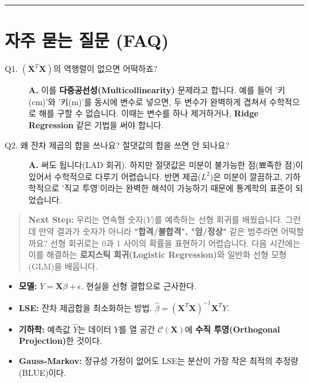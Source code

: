 \documentclass[11pt,a4paper]{book}
\theoremstyle{definition}
\begin{document}
\vspace{0.5cm}\hrule\vspace{0.5cm}

\section{자주 묻는 질문 (FAQ)}

\begin{description}
    \item[Q1. $(\mathbf{X}^T \mathbf{X})$의 역행렬이 없으면 어떡하죠?]
    \textbf{A.} 이를 \textbf{다중공선성(Multicollinearity)} 문제라고 합니다. 예를 들어 '키(cm)'와 '키(m)'를 동시에 변수로 넣으면, 두 변수가 완벽하게 겹쳐서 수학적으로 해를 구할 수 없습니다. 이때는 변수를 하나 제거하거나, \textbf{Ridge Regression} 같은 기법을 써야 합니다.
    
    \item[Q2. 왜 잔차 제곱의 합을 쓰나요? 절댓값의 합을 쓰면 안 되나요?]
    \textbf{A.} 써도 됩니다(LAD 회귀). 하지만 절댓값은 미분이 불가능한 점(뾰족한 점)이 있어서 수학적으로 다루기 어렵습니다. 반면 제곱($L^2$)은 미분이 깔끔하고, 기하학적으로 '직교 투영'이라는 완벽한 해석이 가능하기 때문에 통계학의 표준이 되었습니다.
\end{description}

\vspace{1cm}
\begin{quote}
\textbf{Next Step:} 우리는 연속형 숫자($Y$)를 예측하는 선형 회귀를 배웠습니다. 그런데 만약 결과가 숫자가 아니라 \textbf{"합격/불합격", "암/정상"} 같은 범주라면 어떡할까요? 선형 회귀로는 0과 1 사이의 확률을 표현하기 어렵습니다. 다음 시간에는 이를 해결하는 \textbf{로지스틱 회귀(Logistic Regression)}와 일반화 선형 모형(GLM)을 배웁니다.
\end{quote}

\begin{summarybox}[title={Unit 3 핵심 요약}]
\begin{itemize}
    \item \textbf{모델:} $Y = \mathbf{X}\beta + \epsilon$. 현실을 선형 결합으로 근사한다.
    \item \textbf{LSE:} 잔차 제곱합을 최소화하는 방법. $\hat{\beta} = (\mathbf{X}^T \mathbf{X})^{-1} \mathbf{X}^T Y$.
    \item \textbf{기하학:} 예측값 $\hat{Y}$는 데이터 $Y$를 열 공간 $\mathcal{C}(\mathbf{X})$에 \textbf{수직 투영(Orthogonal Projection)}한 것이다.
    \item \textbf{Gauss-Markov:} 정규성 가정이 없어도 LSE는 분산이 가장 작은 최적의 추정량(BLUE)이다.
\end{itemize}
\end{summarybox}
\end{document}

